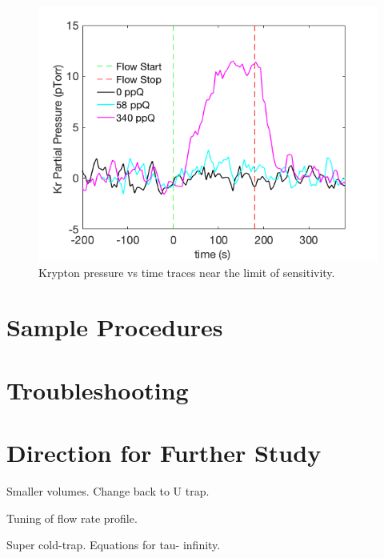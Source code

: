 \documentclass[12pt]{article}
\begin{document}
\begin{figure}[h!]
  \includegraphics[width=\linewidth]{Figures/SLAC_PvT_ppq_sensitivity.png}
  \caption{Krypton pressure vs time traces near the limit of sensitivity.}
  \label{fig:senstrace}
\end{figure}




\appendix
\section{Sample Procedures}
\label{ap:procedures}

\section{Troubleshooting}

\section{Direction for Further Study}
Smaller volumes. Change back to U trap. 

Tuning of flow rate profile.

Super cold-trap. Equations for tau- infinity.



{}

\end{document}
